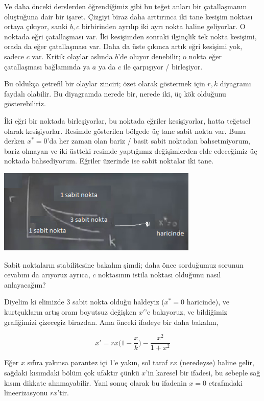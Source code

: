 \documentclass[12pt,fleqn]{article}\usepackage{../../common}
\begin{document}
Ve daha önceki derslerden öğrendiğimiz gibi bu teğet anları bir çatallaşmanın
oluştuğuna dair bir işaret. Çizgiyi biraz daha arttırınca iki tane kesişim
noktası ortaya çıkıyor, sanki $b,c$ birbirinden ayrılıp iki ayrı nokta haline
geliyorlar. O noktada eğri çatallaşması var. İki kesişimden sonraki ilginçlik
tek nokta kesişimi, orada da eğer çatallaşması var. Daha da üste çıkınca artık
eğri kesişimi yok, sadece $c$ var. Kritik olaylar aslında $b$'de oluyor
denebilir; o nokta eğer çatallaşması bağlamında ya $a$ ya da $c$ ile çarpışıyor
/ birleşiyor.

Bu oldukça çetrefil bir olaylar zinciri; özet olarak göstermek için $r,k$
diyagramı faydalı olabilir. Bu diyagramda nerede bir, nerede iki, üç kök
olduğunu gösterebiliriz. 

İki eğri bir noktada birleşiyorlar, bu noktada eğriler kesişiyorlar, hatta
teğetsel olarak kesişiyorlar. Resimde gösterilen bölgede üç tane sabit nokta
var. Bunu derken $x^\ast=0$'da her zaman olan bariz / basit sabit noktadan
bahsetmiyorum, bariz olmayan ve iki üstteki resimde yaptığımız değişimlerden
elde edeceğimiz üç noktada bahsediyorum. Eğriler üzerinde ise sabit noktalar iki
tane.

\includegraphics[height=4cm]{04_08.png}

Sabit noktaların stabilitesine bakalım şimdi; daha önce sorduğumuz sorunun
cevabını da arıyoruz ayrıca, $c$ noktasının istila noktası olduğunu nasıl
anlayacağım? 

Diyelim ki elimizde 3 sabit nokta olduğu haldeyiz ($x^\ast=0$ haricinde), ve
kurtçukların artış oranı boyutsuz değişken $x'$'e bakıyoruz, ve bildiğimiz
grafiğimizi çizecegiz birazdan. Ama önceki ifadeye bir daha bakalım,

$$ x' = rx \bigg( 1 - \frac{x}{k}\bigg) - \frac{x^2}{1+x^2} $$

Eğer $x$ sıfıra yakınsa parantez içi 1'e yakın, sol taraf $rx$ (neredeyse)
haline gelir, sağdaki kısımdaki bölüm çok ufaktır çünkü $x$'in karesel bir
ifadesi, bu sebeple sağ kısım dikkate alınmayabilir. Yani sonuç olarak bu
ifadenin $x=0$ etrafındaki lineerizasyonu $rx$'tir.
\end{document}
